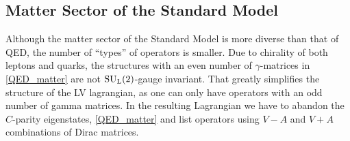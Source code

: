 \documentclass[12pt,preprintnumbers,nofootinbib]{revtex4}
\newcommand{\wt}{\widetilde}
\newcommand{\suc}{{{\rm SU}_{\rm C}(3)}}
\newcommand{\sul}{{{\rm SU}_{\rm L}(2)}}
\begin{document}


\subsection{Matter Sector of the Standard Model}
\label{matter_SM}
	Although the matter sector of the Standard Model is more diverse
	than that of QED, the number of ``types'' of operators is smaller.
	Due to chirality of both leptons and quarks, the structures 
	with an even number of $ \gamma $-matrices in \eqref{QED_matter}
	are not $ \sul $-gauge invariant. 
	That greatly simplifies the structure of the LV lagrangian,
	as one can only have operators with an odd number of gamma
	matrices.
	In the resulting Lagrangian we have to abandon the $C$-parity eigenstates, 
    \eqref{QED_matter} and list operators using $V-A$ and $V+A$ combinations of Dirac matrices. 
	
\end{document}
